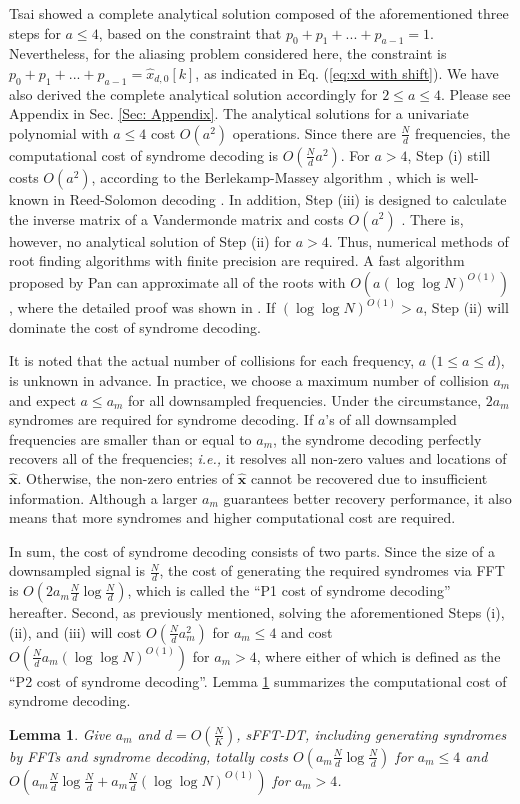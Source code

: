 \documentclass[journal,onecolumn,11pt]{IEEEtran}
\newtheorem{lemma}{Lemma}
\begin{document}
Tsai \cite{Tsai1985} showed a complete analytical solution composed of the aforementioned three steps for $a\leq 4$, based on the constraint that $p_{0}+p_{1}+...+p_{a-1}=1$.
Nevertheless, for the aliasing problem considered here, the constraint is $p_{0}+p_{1}+...+p_{a-1}=\hat{x}_{d,0}[k]$, as indicated in Eq. (\ref{eq:xd with shift}).
We have also derived the complete analytical solution accordingly for $2\leq a\leq 4$.
Please see Appendix in Sec. \ref{Sec: Appendix}.
The analytical solutions for a univariate polynomial with $a\leq 4$ cost $O(a^2)$ operations.
Since there are $\frac{N}{d}$ frequencies, the computational cost of syndrome decoding is $O(\frac{N}{d}a^2)$.
For $a > 4$, Step (i) still costs $O(a^2)$, according to the Berlekamp-Massey algorithm \cite{Massey1963}, which is well-known in Reed-Solomon decoding \cite{MacWilliams11977}.
In addition, Step (iii) is designed to calculate the inverse matrix of a Vandermonde matrix and costs $O (a^2)$ \cite{NChen2008}.
There is, however, no analytical solution of Step (ii) for $a > 4$.
Thus, numerical methods of root finding algorithms with finite precision are required.
A fast algorithm proposed by Pan \cite{Pan2002} can approximate all of the roots with $O(a(\log\log N)^{O(1)})$, where the detailed proof was shown in \cite{Ghazi2013}.
If $(\log\log N)^{O(1)}>a$, Step (ii) will dominate the cost of syndrome decoding.

It is noted that the actual number of collisions for each frequency, $a$ ($1\leq a\leq d$), is unknown in advance.
In practice, we choose a maximum number of collision $a_{m}$ and expect $a\leq a_{m}$ for all downsampled frequencies. Under the circumstance, $2a_{m}$ syndromes are required for syndrome decoding.
If $a$'s of all downsampled frequencies are smaller than or equal to $a_{m}$, the syndrome decoding perfectly recovers all of the frequencies; {\em i.e.,} it resolves all non-zero values and locations of $\bm{\hat{x}}$.
Otherwise, the non-zero entries of $\bm{\hat{x}}$ cannot be recovered due to insufficient information.
Although a larger $a_{m}$ guarantees better recovery performance, it also means that more syndromes and higher computational cost are required.

In sum, the cost of syndrome decoding consists of two parts. Since the size of a downsampled signal is $\frac{N}{d}$, the cost of generating the required syndromes via FFT is $O(2a_{m}\frac{N}{d}\log \frac{N}{d})$, which is called the ``P1 cost of syndrome decoding'' hereafter.
Second, as previously mentioned, solving the aforementioned Steps (i), (ii), and (iii) will cost $ O(\frac{N}{d}a_{m}^2)$ for $a_{m} \leq 4$ and cost $O(\frac{N}{d}a_{m}(\log\log N)^{O(1)})$ for $a_{m} > 4$, where either of which is defined as the ``P2 cost of syndrome decoding''.
Lemma \ref{lemma:cost of non-iterative sFFT-DT} summarizes the computational cost of syndrome decoding.
\begin{lemma}
\label{lemma:cost of non-iterative sFFT-DT}
Give $a_{m}$ and $d=O(\frac{N}{K})$, sFFT-DT, including generating syndromes by FFTs and syndrome decoding, totally costs $O(a_{m}\frac{N}{d}\log \frac{N}{d})$ for $a_{m}\leq 4$ and $O(a_{m}\frac{N}{d}\log \frac{N}{d}+a_{m}\frac{N}{d}(\log \log N)^{O(1)})$ for $a_{m} > 4$.
\end{lemma}
\end{document}
